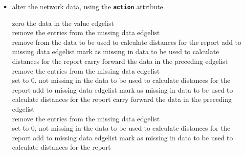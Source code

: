 \documentclass[12pt,a4paper]{article}
\renewcommand{\=}{\,=\,}
\newcommand{\+}{\,+\,}
\newcommand{\sfn}[1]{\textbf{\texttt{#1}}}
\begin{document}
\begin{description}
\begin{itemize}
\item alter the network data, using the
  \sfn{action} attribute.
\begin{algorithmic}
\STATE zero the data in the value edgelist\\
remove the entries from the missing data edgelist\\
remove from the data to be used to calculate distances for the report
\ELSE[option is 3]
\STATE add to missing data edgelist
\STATE mark as missing in data to be used to calculate distances for the report
\ENDIF
\ENDFOR
{}
\STATE carry forward the data in the preceding edgelist\\
remove the entries from the missing data edgelist\\
set to 0, not missing in the data to be used to calculate distances for the report
\ELSE[option is 3]
\STATE add to missing data edgelist
\STATE mark as missing in data to be used to calculate distances for the report
\ENDIF
\ENDFOR
{}
\STATE carry forward the data in the preceding edgelist\\
remove the entries from the missing data edgelist\\
set to 0, not missing in the data to be used to calculate distances for the report
\ELSE[option is  2 or 3]
\STATE add to missing data edgelist
\STATE mark as missing in data to be used to calculate distances for the report

\end{algorithmic}
\end{itemize}
\end{description}
\end{document}
